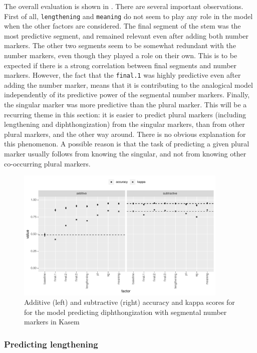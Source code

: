 The overall evaluation is shown in . There are several important observations. First of all, \texttt{lengthening} and \texttt{meaning} do not seem to play any role in the model when the other factors are considered. The final segment of the stem was the most predictive segment, and remained relevant even after adding both number markers. The other two segments seem to be somewhat redundant with the number markers, even though they played a role on their own. This is to be expected if there is a strong correlation between final segments and number markers. However, the fact that the \texttt{final.1} was highly predictive even after adding the number marker, means that it is contributing to the analogical model independently of its predictive power of the segmental number markers. Finally, the singular marker was more predictive than the plural marker. This will be a recurring theme in this section: it is easier to predict plural markers (including lengthening and diphthongization) from the singular markers, than from other plural markers, and the other way around. There is no obvious explanation for this phenomenon. A possible reason is that the task of predicting a given plural marker usually follows from knowing the singular, and not from knowing other co-occurring plural markers.

\begin{figure}
  \centering
  \includegraphics[width=0.9\textwidth]{./figures/kasem/p-fi-dp-sg-overall.pdf}
  \caption{Additive (left) and subtractive (right) accuracy and kappa scores for for the model predicting diphthongization with segmental number markers in Kasem}\label{fig:overall-fi-dp}
\end{figure}

\subsubsection{Predicting lengthening}\label{subsec:pred-length}


